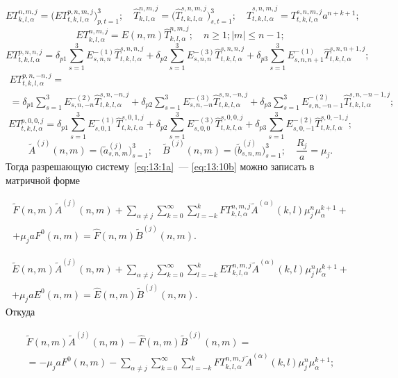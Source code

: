 \begin{equation*}
ET_{k,l,\alpha}^{n,m,j}=\bigg(ET_{t,k,l,\alpha}^{p,n,m,j}\bigg)_{p,t=1}^3;\quad
\hat T_{k,l,\alpha}^{n,m,j}=\bigg(\hat T_{t,k,l,\alpha}^{s,n,m,j}\bigg)_{s,t=1}^3;\quad
\hat T_{t,k,l,\alpha}^{s,n,m,j}=T_{t,k,l,\alpha}^{s,n,m,j} a^{n+k+1};
\end{equation*}
$$
ET_{k,l,\alpha}^{n,m,j}=E(n,m)\hat T_{k,l,\alpha}^{n,m,j};\quad n\ge 1; |m|\le n-1;
$$
$$
ET_{t,k,l,\alpha}^{p,n,n,j}=\delta_{p1}\sum_{s=1}^3 E_{s,n,n}^{-(1)}\hat T_{t,k,l,\alpha}^{s,n,n,j}+\delta_{p2}\sum_{s=1}^3 E_{s,n,n}^{-(3)}\hat T_{t,k,l,\alpha}^{s,n,n,j}+\delta_{p3}\sum_{s=1}^3 E_{s,n,n+1}^{-(1)}\hat T_{t,k,l,\alpha}^{s,n,n+1,j};
$$
\begin{multline*}
ET_{t,k,l,\alpha}^{p,n,-n,j}= \\
=\delta_{p1}\sum_{s=1}^3 E_{s,n,-n}^{-(2)}\hat T_{t,k,l,\alpha}^{s,n,-n,j}+\delta_{p2}\sum_{s=1}^3 E_{s,n,-n}^{-(3)}\hat T_{t,k,l,\alpha}^{s,n,-n,j}+\delta_{p3}\sum_{s=1}^3 E_{s,n,-n-1}^{-(2)}\hat T_{t,k,l,\alpha}^{s,n,-n-1,j};
\end{multline*}
$$
ET_{t,k,l,\alpha}^{p,0,0,j}=\delta_{p1}\sum_{s=1}^3 E_{s,0,1}^{-(1)}\hat T_{t,k,l,\alpha}^{s,0,1,j}+\delta_{p2}\sum_{s=1}^3 E_{s,0,0}^{-(3)}\hat T_{t,k,l,\alpha}^{s,0,0,j}+\delta_{p3}\sum_{s=1}^3 E_{s,0,-1}^{-(2)}\hat T_{t,k,l,\alpha}^{s,0,-1,j};
$$
$$
\tilde A^{(j)}(n,m)=\bigg(\tilde a_{s,n,m}^{(j)}\bigg)_{s=1}^3;\quad \tilde B^{(j)}(n,m)=\bigg(\tilde b_{s,n,m}^{(j)}\bigg)_{s=1}^3;\quad\frac{R_j}{a}=\mu_j.
$$
Тогда разрешающую систему~\eqref{eq:13:1a}~--- \eqref{eq:13:10b} можно записать в матричной форме

\begin{multline}
\tilde F(n,m)\tilde A^{(j)}(n,m)+\sum_{\alpha\neq j}\sum_{k=0}^\infty\sum_{l=-k}^k FT_{k,l,\alpha}^{n,m,j}\tilde A^{(\alpha)}(k,l)\mu_j^n\mu_\alpha^{k+1}+ \\
+\mu_j a F^0(n,m)=\hat F(n,m)\tilde B^{(j)}(n,m).
\label{eq:13:92}
\end{multline}

\begin{multline}
\tilde E(n,m)\tilde A^{(j)}(n,m)+\sum_{\alpha\neq j}\sum_{k=0}^\infty\sum_{l=-k}^k ET_{k,l,\alpha}^{n,m,j}\tilde A^{(\alpha)}(k,l)\mu_j^n\mu_\alpha^{k+1}+ \\
+\mu_j a E^0(n,m)=\hat E(n,m)\tilde B^{(j)}(n,m).
\label{eq:13:92a}
\end{multline}
Откуда

\begin{multline}
\tilde F(n,m)\tilde A^{(j)}(n,m)-\hat F(n,m)\tilde B^{(j)}(n,m)= \\
=-\mu_j a F^0(n,m)-\sum_{\alpha\neq j}\sum_{k=0}^\infty\sum_{l=-k}^k FT_{k,l,\alpha}^{n,m,j}\tilde A^{(\alpha)}(k,l)\mu_j^n\mu_\alpha^{k+1};
\label{eq:13:93a}
\end{multline}

